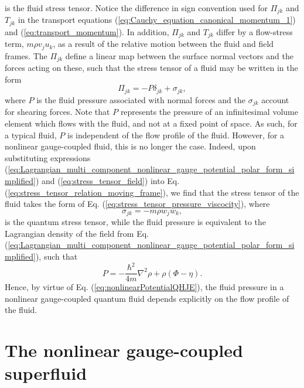 \documentclass[twocolumn, nofootinbib, nobibnotes, amsmath,amssymb,aps, pra, floatfix]{revtex4-1}
\begin{document}
is the fluid stress tensor.
Notice the difference in sign convention used for $\Pi_{jk}$ and $T_{jk}$ in the transport equations (\ref{eq:Cauchy_equation_canonical_momentum_1}) and (\ref{eq:transport_momentum}).
In addition, $\Pi_{jk}$ and $T_{jk}$ differ by a flow-stress term, $m\rho v_ju_k$, as a result of the relative motion between the fluid and field frames.
The $\Pi_{jk}$ define a linear map between the surface normal vectors and the forces acting on these, such that the stress tensor of a fluid may be written in the form \cite{landau1959lifshitz}
\begin{equation}
  \Pi_{jk}=-P\delta_{jk}+\sigma_{jk},
  \label{eq:stress_tensor_pressure_viscocity}
\end{equation}
where $P$ is the fluid pressure associated with normal forces and the $\sigma_{jk}$ account for shearing forces.
Note that $P$ represents the pressure of an infinitesimal volume element which flows with the fluid, and not at a fixed point of space.
As such, for a typical fluid, $P$ is independent of the flow profile of the fluid.
However, for a nonlinear gauge-coupled fluid, this is no longer the case.
Indeed, upon substituting expressions (\ref{eq:Lagrangian_multi_component_nonlinear_gauge_potential_polar_form_simplified}) and (\ref{eq:stress_tensor_field}) into Eq. (\ref{eq:stress_tensor_relation_moving_frame}), we find that the stress tensor of the fluid takes the form of Eq. (\ref{eq:stress_tensor_pressure_viscocity}), where 
\begin{equation}
  \sigma_{jk}=-m\rho w_jw_k,
  \label{eq:quantum_stress_tensor_2}
\end{equation}
is the quantum stress tensor, while the fluid pressure is equivalent to the Lagrangian density of the field from Eq. (\ref{eq:Lagrangian_multi_component_nonlinear_gauge_potential_polar_form_simplified}), such that 
\begin{equation}
  P=-\frac{\hbar^2}{4m}\nabla^2\rho+\rho\left( \Phi-\eta \right).
  \label{eq:pressureNonlinearGaugeCoupledFluid}
\end{equation}
Hence, by virtue of Eq. (\ref{eq:nonlinearPotentialQHJE}), the fluid pressure in a nonlinear gauge-coupled quantum fluid depends explicitly on the flow profile of the fluid.
\section{\label{sec:single_component}The nonlinear gauge-coupled superfluid}
\end{document}
